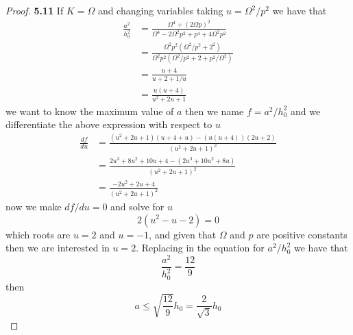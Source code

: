 \documentclass[11pt]{article}
\theoremstyle{definition}
\begin{document}
\begin{proof}{\textbf{5.11}}
        If $K = \Omega$ and changing variables taking $u = \Omega^2/p^2$ we
        have that
        \begin{align*}
            \frac{a^2}{h_0^2} &= \frac{\Omega^4+(2\Omega p)^2}{\Omega^4 - 2\Omega^2p^2 + p^4 + 4\Omega^2p^2} \\
             &= \frac{\Omega^2p^2(\Omega^2/p^2 + 2^2)}{\Omega^2p^2(\Omega^2/p^2 + 2 + p^2/\Omega^2)} \\
             &= \frac{u + 4}{u + 2 + 1/u} \\
             &= \frac{u(u + 4)}{u^2 + 2u + 1}
        \end{align*}
        we want to know the maximum value of $a$ then we name $f = a^2/h_0^2$
        and we differentiate the above expression with respect to $u$
        \begin{align*}
            \frac{df}{du} &= \frac{(u^2 + 2u + 1)(u + 4 + u) - (u(u + 4))(2u + 2)}{(u^2 + 2u + 1)^2} \\
                &= \frac{2u^3 + 8u^2 + 10u + 4 - (2u^3 + 10u^2 + 8u)}{(u^2 + 2u + 1)^2} \\
                &= \frac{-2u^2 + 2u + 4}{(u^2 + 2u + 1)^2}            
        \end{align*}
        now we make $df/du = 0$ and solve for $u$
        $$2(u^2 - u - 2) = 0$$
        which roots are $u = 2$ and $u = -1$, and given that $\Omega$ and $p$
        are positive constants then we are interested in $u = 2$. Replacing in
        the equation for $a^2/h_0^2$ we have that
        $$\frac{a^2}{h_0^2} = \frac{12}{9}$$
        then
        $$a \leq \sqrt{\frac{12}{9}}h_0 = \frac{2}{\sqrt{3}}h_0$$
    \end{proof}
\cleardoublepage
\end{document}
